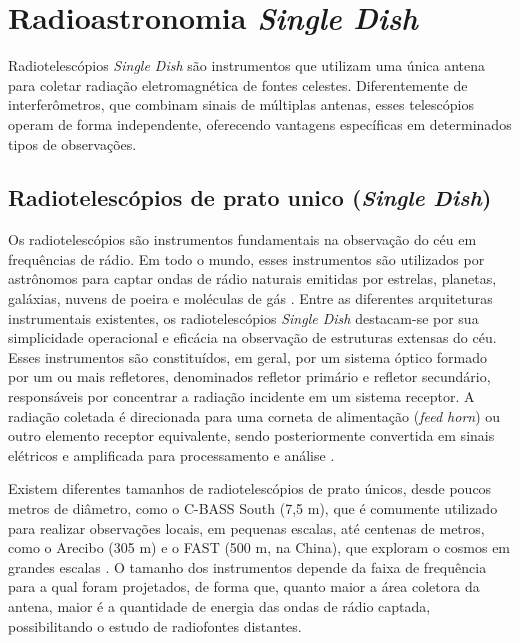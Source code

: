 \chapter{Radioastronomia \textit{Single Dish}}

Radiotelescópios \textit{Single Dish} são instrumentos que utilizam uma única antena para coletar radiação eletromagnética de fontes celestes. Diferentemente de interferômetros, que combinam sinais de múltiplas antenas, esses telescópios operam de forma independente, oferecendo vantagens específicas em determinados tipos de observações.

\section{Radiotelescópios  de prato unico (\textit{Single Dish})}

Os radiotelescópios são instrumentos fundamentais na observação do céu em frequências de rádio. Em todo o mundo, esses instrumentos são utilizados por astrônomos para captar ondas de rádio naturais emitidas por estrelas, planetas, galáxias, nuvens de poeira e moléculas de gás \cite{libretexts_radio_reflecting_telescope}. Entre as diferentes arquiteturas instrumentais existentes, os radiotelescópios \textit{Single Dish} destacam-se por sua simplicidade operacional e eficácia na observação de estruturas extensas do céu. Esses instrumentos são constituídos, em geral, por um sistema óptico formado por um ou mais refletores, denominados refletor primário e refletor secundário, responsáveis por concentrar a radiação incidente em um sistema receptor. A radiação coletada é direcionada para uma corneta de alimentação (\textit{feed horn}) ou outro elemento receptor equivalente, sendo posteriormente convertida em sinais elétricos e amplificada para processamento e análise \cite{selvaraj2021all}.


Existem diferentes tamanhos de radiotelescópios de prato únicos, desde poucos metros de diâmetro, como o C-BASS South (7,5 m), que é comumente utilizado para realizar observações locais, em pequenas escalas, até centenas de metros, como o Arecibo (305 m) e o FAST (500 m, na China), que exploram o cosmos em grandes escalas \cite{selvaraj2021all}. O tamanho dos instrumentos depende da faixa de frequência para a qual foram projetados, de forma que, quanto maior a área coletora da antena, maior é a quantidade de energia das ondas de rádio captada, possibilitando o estudo de radiofontes distantes.

